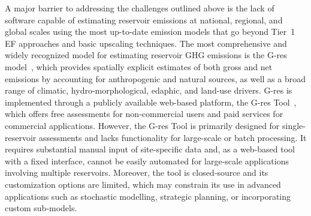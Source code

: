 \documentclass[final,1p,times]{elsarticle}
\begin{document}
A major barrier to addressing the challenges outlined above is the lack of software capable of estimating reservoir emissions at national, regional, and global scales using the most up-to-date emission models that go beyond Tier~1 \acf{EF} approaches and basic upscaling techniques.
The most comprehensive and widely recognized model for estimating reservoir \ac{GHG} emissions is the G-res model~\citep{Prairie2017b, Prairie2021}, which provides spatially explicit estimates of both gross and net emissions by accounting for anthropogenic and natural sources, as well as a broad range of climatic, hydro-morphological, edaphic, and land-use drivers.
G-res is implemented through a publicly available web-based platform, the G-res Tool~\citep{prairie2017gres}, which offers free assessments for non-commercial users and paid services for commercial applications.
However, the G-res Tool is primarily designed for single-reservoir assessments and lacks functionality for large-scale or batch processing.
It requires substantial manual input of site-specific data and, as a web-based tool with a fixed interface, cannot be easily automated for large-scale applications involving multiple reservoirs.
Moreover, the tool is closed‑source and its customization options are limited, which may constrain its use in advanced applications such as stochastic modelling, strategic planning, or incorporating custom sub‑models.


\end{document}
